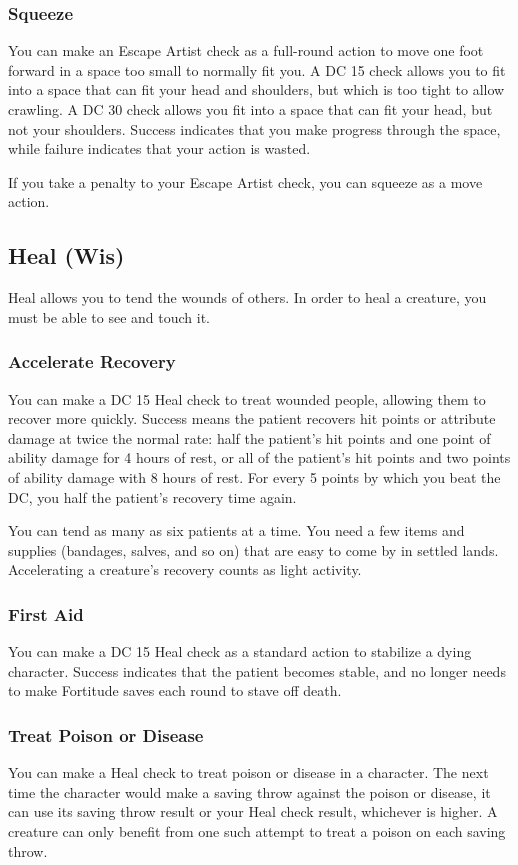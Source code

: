 \subsubsection{Squeeze}
You can make an Escape Artist check as a full-round action to move one foot forward in a space too small to normally fit you. A DC 15 check allows you to fit into a space that can fit your head and shoulders, but which is too tight to allow crawling. A DC 30 check allows you fit into a space that can fit your head, but not your shoulders. Success indicates that you make progress through the space, while failure indicates that your action is wasted.

If you take a  penalty to your Escape Artist check, you can squeeze as a move action.

\subsection{Heal (Wis)}\label{Heal}
Heal allows you to tend the wounds of others. In order to heal a creature, you must be able to see and touch it.

\subsubsection{Accelerate Recovery}
You can make a DC 15 Heal check to treat wounded people, allowing them to recover more quickly. Success means the patient recovers hit points or attribute damage at twice the normal rate: half the patient's hit points and one point of ability damage for 4 hours of rest, or all of the patient's hit points and two points of ability damage with 8 hours of rest. For every 5 points by which you beat the DC, you half the patient's recovery time again.

You can tend as many as six patients at a time. You need a few items and supplies (bandages, salves, and so on) that are easy to come by in settled lands. Accelerating a creature's recovery counts as light activity. %

\subsubsection{First Aid}
You can make a DC 15 Heal check as a standard action to stabilize a dying character. Success indicates that the patient becomes stable, and no longer needs to make Fortitude saves each round to stave off death. 

\subsubsection{Treat Poison or Disease}
You can make a Heal check to treat poison or disease in a character. The next time the character would make a saving throw against the poison or disease, it can use its saving throw result or your Heal check result, whichever is higher. A creature can only benefit from one such attempt to treat a poison on each saving throw.

